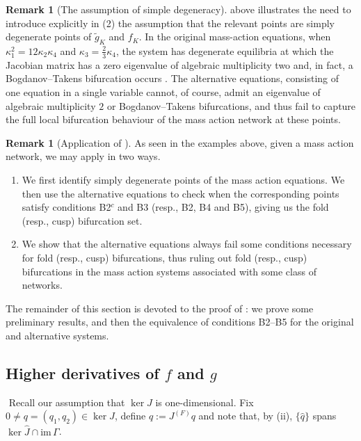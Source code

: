 \documentclass[11pt]{amsart}
\renewcommand{\k}{\kappa}
\newcommand{\wJ}{\hat{J}}
\theoremstyle{definition}
\newtheorem{remark}[theorem]{Remark}
\begin{document}
\begin{remark}[The assumption of simple degeneracy]
 above illustrates the need to introduce explicitly in (2) the assumption that the relevant points are simply degenerate points of $\tilde{g}_K$ and $f_K$. In the original mass-action equations, when $\k_1^2 = 12 \k_2\k_4$ and $\k_3 = \frac{2}{3}\k_4$, the system has degenerate equilibria at which the Jacobian matrix has a zero eigenvalue of algebraic multiplicity two and, in fact, a Bogdanov--Takens bifurcation occurs \cite[Example 2]{BBH2024smallbif}. The alternative equations, consisting of one equation in a single variable cannot, of course, admit an eigenvalue of algebraic multiplicity $2$ or Bogdanov--Takens bifurcations, and thus fail to capture the full local bifurcation behaviour of the mass action network at these points. 
\end{remark}

\begin{remark}[Application of ]
As seen in the examples above, given a mass action network, we may apply  in two ways.
\begin{enumerate}
\item We first identify simply degenerate points of the mass action equations. We then use the alternative equations to check when the corresponding points satisfy conditions B2$^{c}$ and B3 (resp., B2, B4 and B5), giving us the fold (resp., cusp) bifurcation set. 

\item We show that the alternative equations always fail some conditions necessary for fold (resp., cusp) bifurcations, thus ruling out fold (resp., cusp) bifurcations in the mass action systems associated with some class of networks. 

\end{enumerate}

\end{remark}

The remainder of this section is devoted to the proof of : we prove some preliminary results, and then the equivalence of conditions B2--B5 for the original and alternative systems.

\subsection{Higher derivatives of $f$ and $g$}

${}$
Recall our assumption that $\ker J$ is one-dimensional. Fix $0 \neq q =(q_1, q_2) \in \ker J$, define $\hat{q}:= J^{(F)}q$ and note that, by (ii), $\{\hat{q}\}$ spans $\ker \wJ \cap \mathrm{im}\,\Gamma$. 
\end{document}
